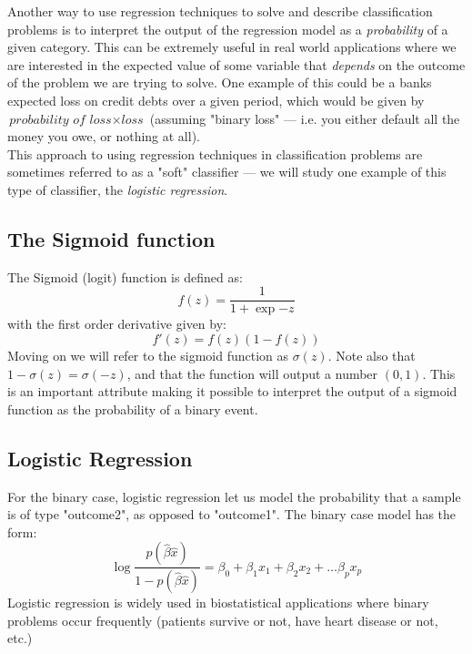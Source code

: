 \documentclass[10pt, a4paper, twocolumn]{article}
\begin{document}
		Another way to use regression techniques to solve and describe classification problems is to interpret the output of the regression model as a \emph{probability} of a given category. This can be extremely useful in real world applications where we are interested in the expected value of some variable that \emph{depends} on the outcome of the problem we are trying to solve. One example of this could be a banks expected loss on credit debts over a given period, which would be given by $\textit{probability of loss}\times\textit{loss}$ (assuming "binary loss" --- i.e. you either default all the money you owe, or nothing at all).\\
		This approach to using regression techniques in classification problems are sometimes referred to as a "soft" classifier --- we will study one example of this type of classifier, the \emph{logistic regression}. 
		
	\subsection{The Sigmoid function}
		The Sigmoid (logit) function is defined as:
			$$f(z) = \frac{1}{1+\exp{-z}}$$
		with the first order derivative given by:
			$$f'(z)=f(z)(1-f(z))$$
		Moving on we will refer to the sigmoid function as $\sigma (z)$. Note also that $1-\sigma(z)=\sigma(-z)$, and that the function will output a number $(0,1)$.
		This is an important attribute making it possible to interpret the output of a sigmoid function as the probability of a binary event.
			
	\subsection{Logistic Regression}
		For the binary case, logistic regression let us model the probability that a sample is of type "outcome2", as opposed to "outcome1". The binary case model has the form:
		$$\log{\frac{p(\hat{\beta}\hat{x})}{1-p(\hat{\beta}\hat{x})}}=\beta_0+\beta_1 x_1+\beta_2 x_2+\dots\beta_p x_p$$
		Logistic regression is widely used in biostatistical applications where binary problems occur frequently (patients survive or not, have heart disease or not, etc.)\cite{ElementsOfStatLearning}
\end{document}
